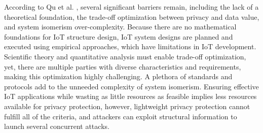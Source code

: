 
According to Qu et al. \cite{Qu2018Privacy}, several significant barriers
remain, including the lack of a theoretical foundation, the trade-off optimization
between privacy and data value, and system isomerism over-complexity. Because
there are no mathematical foundations for IoT structure design, IoT system
designs are planned and executed using empirical approaches, which have
limitations in IoT development. Scientific theory and quantitative analysis
must enable trade-off optimization, yet, there are multiple parties with
diverse characteristics and requirements, making this optimization highly
challenging. A plethora of standards and protocols add to the unneeded complexity
of system isomerism. Ensuring effective IoT applications while wasting as
little resources as feasible implies less resources available for privacy
protection, however, lightweight privacy protection cannot fulfill all of
the criteria, and attackers can exploit structural information to launch
several concurrent attacks.

